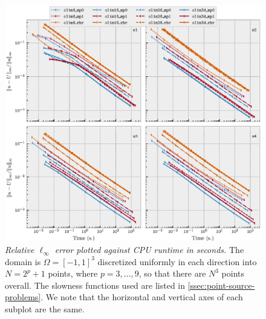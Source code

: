 \documentclass[sisc-eikonal.tex]{subfiles}
\begin{document}
\begin{figure}
  \centering \includegraphics[width=\linewidth]{time_vs_error_3d.eps}
  \caption{\emph{Relative $\ell_\infty$ error plotted against CPU
      runtime in seconds.} The domain is $\Omega = [-1, 1]^3$
    discretized uniformly in each direction into $N = 2^p + 1$ points,
    where $p = 3, \hdots, 9$, so that there are $N^3$ points
    overall. The slowness functions used are listed in
    \cref{ssec:point-source-problems}. We note that the horizontal and
    vertical axes of each subplot are the
    same.}\label{fig:time-vs-error}
\end{figure}
\end{document}
